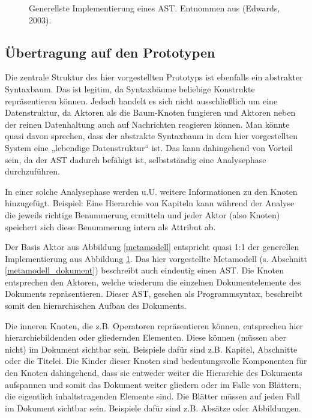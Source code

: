  
\begin{figure}[h!]
\centering
\advance\leftskip-2.5cm
\caption{ Generellste Implementierung eines AST. Entnommen aus (Edwards, 2003). }\label{astimpl}
\end{figure}
 
\subsection{Übertragung auf den Prototypen}\label{}
 
Die zentrale Struktur des hier vorgestellten Prototyps ist ebenfalls ein abstrakter Syntaxbaum. Das ist legitim, da Syntaxbäume beliebige Konstrukte repräsentieren können. Jedoch handelt es sich nicht ausschließlich um eine Datenstruktur, da Aktoren als die Baum-Knoten fungieren und Aktoren neben der reinen Datenhaltung auch auf Nachrichten reagieren können. Man könnte quasi davon sprechen, dass der abstrakte Syntaxbaum in dem hier vorgestellten System eine „lebendige Datenstruktur“ ist. Das kann dahingehend von Vorteil sein, da der AST dadurch befähigt ist, selbstständig eine Analysephase durchzuführen.

 
In einer solche Analysephase werden u.U. weitere Informationen zu den Knoten hinzugefügt. Beispiel: Eine Hierarchie von Kapiteln kann während der Analyse die jeweils richtige Benummerung ermitteln und jeder Aktor (also Knoten) speichert sich diese Benummerung intern als Attribut ab.

 
Der Basis Aktor aus Abbildung \ref{metamodell} entspricht quasi 1:1 der generellen Implementierung aus Abbildung \ref{astimpl}. Das hier vorgestellte Metamodell (s. Abschnitt \ref{metamodell_dokument}) beschreibt auch eindeutig einen AST. Die Knoten entsprechen den Aktoren, welche wiederum die einzelnen Dokumentelemente des Dokuments repräsentieren. Dieser AST, gesehen als Programmsyntax, beschreibt somit den hierarchischen Aufbau des Dokuments.

 
Die inneren Knoten, die z.B. Operatoren repräsentieren können, entsprechen hier hierarchiebildenden oder gliedernden Elementen. Diese können (müssen aber nicht) im Dokument sichtbar sein. Beispiele dafür sind z.B. Kapitel, Abschnitte oder die Titelei. Die Kinder dieser Knoten sind bedeutungsvolle Komponenten für den Knoten dahingehend, dass sie entweder weiter die Hierarchie des Dokuments aufspannen und somit das Dokument weiter gliedern oder im Falle von Blättern, die eigentlich inhaltstragenden Elemente sind. Die Blätter müssen auf jeden Fall im Dokument sichtbar sein. Beispiele dafür sind z.B. Absätze oder Abbildungen.

